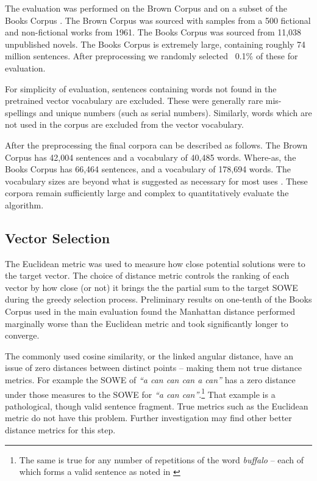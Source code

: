 \documentclass{book}
\begin{document}
The evaluation was performed on the Brown Corpus \parencite{francis1979brown} and on a subset of the Books Corpus \parencite{moviebook}. The Brown Corpus was sourced with samples from a 500 fictional and non-fictional works from 1961. The Books Corpus was sourced from 11,038 unpublished novels. The Books Corpus is extremely large, containing roughly 74 million sentences. After preprocessing we randomly selected ~0.1\% of these for evaluation.

For simplicity of evaluation, sentences containing words not found in the pretrained vector vocabulary are excluded. These were generally rare mis-spellings and unique numbers (such as serial numbers). Similarly, words which are not used in the corpus are excluded from the vector vocabulary. 

After the preprocessing the final corpora can be described as follows. The Brown Corpus has 42,004 sentences and a vocabulary of 40,485 words. Where-as, the Books Corpus has 66,464 sentences, and a vocabulary of 178,694 words. The vocabulary sizes are beyond what is suggested as necessary for most uses \parencite{nation2006large}. These corpora remain sufficiently large and complex to quantitatively evaluate the algorithm.

\subsection{Vector Selection}
The Euclidean metric was used to measure how close potential solutions were to the target vector. The choice of distance metric controls the ranking of each vector by how close (or not) it brings the the partial sum  to the target SOWE during the greedy selection process. Preliminary results on one-tenth of the Books Corpus used in the main evaluation found the Manhattan distance performed marginally worse than the Euclidean metric and took significantly longer to converge.

The commonly used cosine similarity, or the linked angular distance, have an issue of zero distances between distinct points -- making them not true distance metrics. For example the SOWE of \emph{``a can can can a can''} has a zero distance under those measures to the SOWE for \emph{``a can can''}.\footnote{The same is true for any number of repetitions of the word \emph{buffalo} -- each of which forms a valid sentence as noted in \textcite{tymoczko1995sweet}} That example is a pathological, though valid sentence fragment. True metrics such as the Euclidean metric do not have this problem. Further investigation may find other better distance metrics for this step. 
\end{document}
